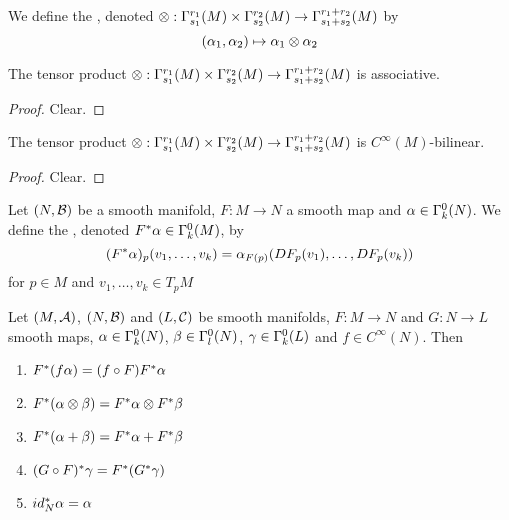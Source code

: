 \documentclass{book}
\begin{document}
	\begin{defn}
	We define the , denoted $\otimes : \Gamma^{r_1}_{s_1}(M) \times \Gamma^{r_2}_{s_2}(M) \rightarrow \Gamma^{r_1+r_2}_{s_1+s_2}(M)$ by $$(\alpha_1, \alpha_2) \mapsto \alpha_1 \otimes \alpha_2 $$
	\end{defn}	
	
	\begin{ex}
	The tensor product $\otimes : \Gamma^{r_1}_{s_1}(M) \times \Gamma^{r_2}_{s_2}(M) \rightarrow \Gamma^{r_1+r_2}_{s_1+s_2}(M)$ is associative.
	\end{ex}
	
	\begin{proof}
	Clear.
	\end{proof}
	
	\begin{ex}
	The tensor product $\otimes : \Gamma^{r_1}_{s_1}(M) \times \Gamma^{r_2}_{s_2}(M) \rightarrow \Gamma^{r_1+r_2}_{s_1+s_2}(M)$ is $C^{\infty}(M)$-bilinear.
	\end{ex}
	
	\begin{proof}
	Clear.
	\end{proof}
	
	\begin{defn}
	Let $(N, \mathcal{B})$ be a smooth manifold, $F:M \rightarrow N$ a smooth map and $\alpha \in \Gamma^0_k(N)$. We define the , denoted $F^*\alpha \in \Gamma^0_k(M)$, by  $$(F^*\alpha)_p(v_1, \dots, v_k) = \alpha_{F(p)} (DF_p(v_1), \dots, DF_p(v_k))$$ for $p \in M$ and $v_1, \dots, v_k \in T_pM$
	\end{defn}

	\begin{ex}
	Let $(M, \mathcal{A})$, $(N, \mathcal{B})$ and $(L, \mathcal{C})$ be smooth manifolds, $F:M \rightarrow N$ and $G:N \rightarrow L$ smooth maps, $\alpha \in \Gamma^0_k(N)$, $\beta  \in \Gamma^0_l(N)$, $\gamma \in \Gamma^0_k(L)$ and $f \in C^{\infty}(N)$. Then 
	\begin{enumerate}
	\item $F^*(f \alpha) = (f \circ F) F^* \alpha$
	\item $F^*(\alpha \otimes \beta) = F^*\alpha \otimes F^* \beta$
	\item $F^*(\alpha + \beta) = F^* \alpha + F^* \beta $
	\item $(G \circ F)^*\gamma = F^*(G^* \gamma)$
	\item $id_N^* \alpha = \alpha$
	\end{enumerate}
	\end{ex}
	
\end{document}
